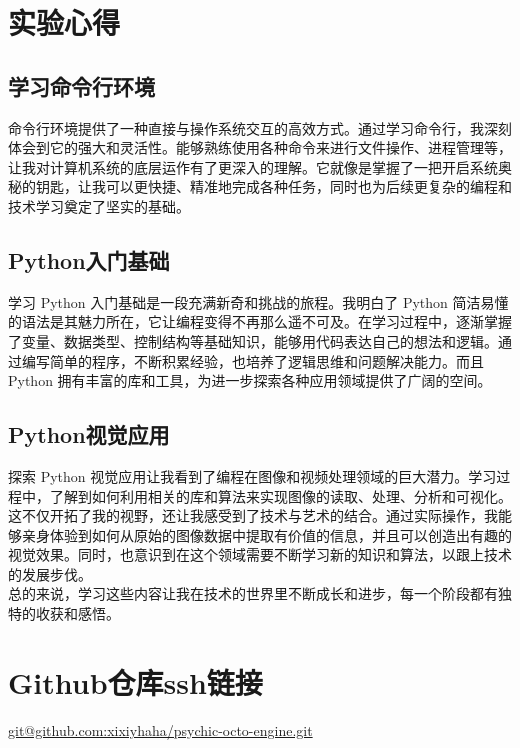 \documentclass{ctexart}
\begin{document}
\section{实验心得}
\subsection{学习命令行环境}

命令行环境提供了一种直接与操作系统交互的高效方式。通过学习命令行，我深刻体会到它的强大和灵活性。能够熟练使用各种命令来进行文件操作、进程管理等，让我对计算机系统的底层运作有了更深入的理解。它就像是掌握了一把开启系统奥秘的钥匙，让我可以更快捷、精准地完成各种任务，同时也为后续更复杂的编程和技术学习奠定了坚实的基础。

\subsection{Python入门基础}

学习 Python 入门基础是一段充满新奇和挑战的旅程。我明白了 Python 简洁易懂的语法是其魅力所在，它让编程变得不再那么遥不可及。在学习过程中，逐渐掌握了变量、数据类型、控制结构等基础知识，能够用代码表达自己的想法和逻辑。通过编写简单的程序，不断积累经验，也培养了逻辑思维和问题解决能力。而且 Python 拥有丰富的库和工具，为进一步探索各种应用领域提供了广阔的空间。

\subsection{Python视觉应用}

探索 Python 视觉应用让我看到了编程在图像和视频处理领域的巨大潜力。学习过程中，了解到如何利用相关的库和算法来实现图像的读取、处理、分析和可视化。这不仅开拓了我的视野，还让我感受到了技术与艺术的结合。通过实际操作，我能够亲身体验到如何从原始的图像数据中提取有价值的信息，并且可以创造出有趣的视觉效果。同时，也意识到在这个领域需要不断学习新的知识和算法，以跟上技术的发展步伐。\\

总的来说，学习这些内容让我在技术的世界里不断成长和进步，每一个阶段都有独特的收获和感悟。
\section{Github仓库ssh链接}
 \url {git@github.com:xixiyhaha/psychic-octo-engine.git }
\end{document}
